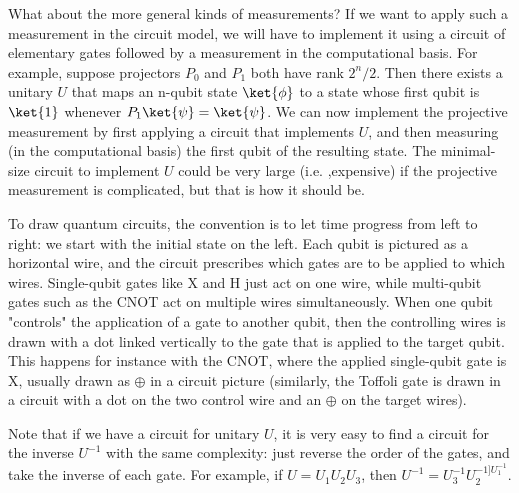 \documentclass[12pt, oneside]{book}
\theoremstyle{definition}
\theoremstyle{definition}
\theoremstyle{remark}
\begin{document}
What about the more general kinds of measurements? If we want to apply such a measurement in the circuit model, we will have to implement it using a circuit of elementary gates followed by a measurement in the computational basis. For example, suppose projectors $P_0$ and $P_1$ both have rank $2^n/2$. Then there exists a unitary $U$ that maps an n-qubit state $\ket{\phi}$ to a state whose first qubit is $\ket{1}$ whenever $P_1\ket{\psi}=\ket{\psi}$. We can now implement the projective measurement by first applying a circuit that implements $U$, and then measuring (in the computational basis) the first qubit of the resulting state. The minimal-size circuit to implement $U$ could be very large (i.e. ,expensive) if the projective measurement is complicated, but that is how it should be.

To draw quantum circuits, the convention is to let time progress from left to right: we start with the initial state on the left. Each qubit is pictured as a horizontal wire, and the circuit prescribes which gates are to be applied to which wires. Single-qubit gates like X and H just act on one wire, while multi-qubit gates such as the CNOT act on multiple wires simultaneously. When one qubit "controls" the application of a gate to another qubit, then the controlling wires is drawn with a dot linked vertically to the gate that is applied to the target qubit. This happens for instance with the CNOT, where the applied single-qubit gate is X, usually drawn as $\oplus$ in a circuit picture (similarly, the Toffoli gate is drawn in a circuit with a dot on the two control wire and an $\oplus$ on the target wires).

Note that if we have a circuit for unitary $U$, it is very easy to find a circuit for the inverse $U^{-1}$ with the same complexity: just reverse the order of the gates, and take the inverse of each gate. For example, if $U=U_1U_2U_3$, then $U^{-1}=U_3^{-1} U_2^{-1]U_1^{-1}}$.
\end{document}
